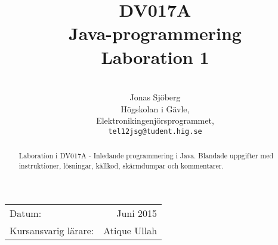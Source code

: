 \documentclass[11pt,a4paper]{article}
\title{DV017A \\ Java-programmering \\ Laboration 1}
\author{\\
  Jonas Sjöberg\\
  Högskolan i Gävle,\\
  Elektronikingenjörsprogrammet,\\
  \texttt{tel12jsg@tudent.hig.se}
}
\date{}
\begin{document}
    \maketitle

    \begin{center}
    \begin{tabular}{l r}
        Datum: & Juni 2015 \\
        Kursansvarig lärare: & Atique Ullah
    \end{tabular}
    \end{center}

    \begin{abstract}
        Laboration i DV017A - Inledande programmering i Java. Blandade uppgifter
        med instruktioner, lösningar, källkod, skärmdumpar och kommentarer.
    \end{abstract}

    \newpage
    \setcounter{tocdepth}{3}
    \tableofcontents
    \newpage

%   
    
    
    
    
    
    
    
    
    
    
%   

    \newpage

    
\end{document}
